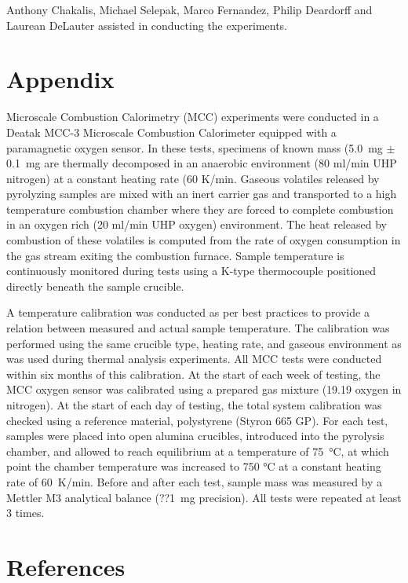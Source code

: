 \documentclass[12pt]{article}
\begin{document}
Anthony Chakalis, Michael Selepak, Marco Fernandez, Philip Deardorff and Laurean DeLauter assisted in conducting the experiments.



\clearpage
\section{Appendix}
Microscale Combustion Calorimetry (MCC) experiments were conducted in a Deatak MCC-3 Microscale Combustion Calorimeter equipped with a paramagnetic oxygen sensor. In these tests, specimens of known mass (5.0~mg $\pm$ 0.1~mg are thermally decomposed in an anaerobic environment (80 ml/min UHP nitrogen) at a constant heating rate (60 K/min. Gaseous volatiles released by pyrolyzing samples are mixed with an inert carrier gas and transported to a high temperature combustion chamber where they are forced to complete combustion in an oxygen rich (20 ml/min UHP oxygen) environment. The heat released by combustion of these volatiles is computed from the rate of oxygen consumption in the gas stream exiting the combustion furnace. Sample temperature is continuously monitored during tests using a K-type thermocouple positioned directly beneath the sample crucible.

A temperature calibration was conducted as per best practices \cite{ASTM_D7309} to provide a relation between measured and actual sample temperature. The calibration was performed using the same crucible type, heating rate, and gaseous environment as was used during thermal analysis experiments. All MCC tests were conducted within six months of this calibration. At the start of each week of testing, the MCC oxygen sensor was calibrated using a prepared gas mixture (19.19 %
oxygen in nitrogen). At the start of each day of testing, the total system calibration was checked using a reference material, polystyrene (Styron 665 GP). For each test, samples were placed into open alumina crucibles, introduced into the pyrolysis chamber, and allowed to reach equilibrium at a temperature of 75~°C, at which point the chamber temperature was increased to 750 °C at a constant heating rate of 60~K/min. Before and after each test, sample mass was measured by a Mettler M3 analytical balance (??1~mg precision). All tests were repeated at least 3 times.
\clearpage

\section*{References}


\end{document}
